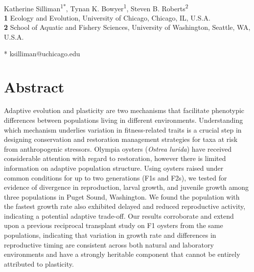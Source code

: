 \documentclass[10pt,letterpaper]{article}
\date{}
\begin{document}
\vspace*{0.2in}

\begin{flushleft}
{\Large
\textbf{} %
}
\newline
\\
Katherine Silliman\textsuperscript{1*},
Tynan K. Bowyer\textsuperscript{1},
Steven B. Roberts\textsuperscript{2}
\\
\bigskip
\textbf{1} Ecology and Evolution, University of Chicago, Chicago, IL, U.S.A.
\\
\textbf{2} School of Aquatic and Fishery Sciences, University of Washington, Seattle, WA, U.S.A.
\\
\bigskip

* ksilliman@uchicago.edu

\end{flushleft}
\section*{Abstract}
Adaptive evolution and plasticity are two mechanisms that facilitate phenotypic differences between populations living in different environments. Understanding which mechanism underlies variation in fitness-related traits is a crucial step in designing conservation and restoration management strategies for taxa at risk from anthropogenic stressors. Olympia oysters (\textit{Ostrea lurida}) have received considerable attention with regard to restoration, however there is limited information on adaptive population structure. Using oysters raised under common conditions for up to two generations (F1s and F2s), we tested for evidence of divergence in reproduction, larval growth, and juvenile growth among three populations in Puget Sound, Washington. We found the population with the fastest growth rate also exhibited delayed and reduced reproductive activity, indicating a potential adaptive trade-off. Our results corroborate and extend upon a previous reciprocal transplant study on F1 oysters from the same populations, indicating that variation in growth rate and differences in reproductive timing are consistent across both natural and laboratory environments and have a strongly heritable component that cannot be entirely attributed to plasticity. 
\end{document}
